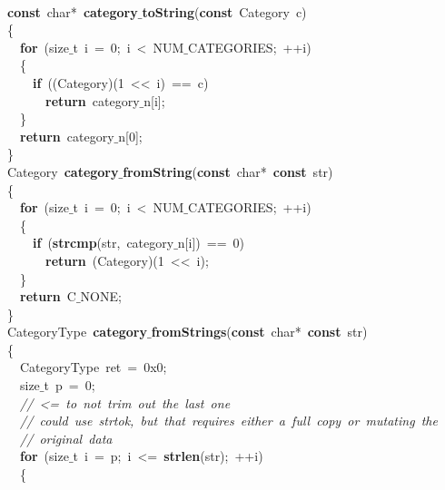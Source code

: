 \documentclass{article}
\begin{document}
\mbox{} \\
\mbox{}\textbf{const}\ char*\ \textbf{category$\_$toString}(\textbf{const}\ Category\ c) \\
\mbox{}\{ \\
\mbox{}\ \ \textbf{for}\ (size$\_$t\ i\ =\ 0;\ i\ \textless{}\ NUM$\_$CATEGORIES;\ ++i) \\
\mbox{}\ \ \{ \\
\mbox{}\ \ \ \ \textbf{if}\ ((Category)(1\ \textless{}\textless{}\ i)\ ==\ c) \\
\mbox{}\ \ \ \ \ \ \textbf{return}\ category$\_$n[i]; \\
\mbox{}\ \ \} \\
\mbox{}\ \ \textbf{return}\ category$\_$n[0]; \\
\mbox{}\} \\
\mbox{}Category\ \textbf{category$\_$fromString}(\textbf{const}\ char*\ \textbf{const}\ str) \\
\mbox{}\{ \\
\mbox{}\ \ \textbf{for}\ (size$\_$t\ i\ =\ 0;\ i\ \textless{}\ NUM$\_$CATEGORIES;\ ++i) \\
\mbox{}\ \ \{ \\
\mbox{}\ \ \ \ \textbf{if}\ (\textbf{strcmp}(str,\ category$\_$n[i])\ ==\ 0) \\
\mbox{}\ \ \ \ \ \ \textbf{return}\ (Category)(1\ \textless{}\textless{}\ i); \\
\mbox{}\ \ \} \\
\mbox{}\ \ \textbf{return}\ C$\_$NONE; \\
\mbox{}\} \\
\mbox{}CategoryType\ \textbf{category$\_$fromStrings}(\textbf{const}\ char*\ \textbf{const}\ str) \\
\mbox{}\{ \\
\mbox{}\ \ CategoryType\ ret\ =\ 0x0; \\
\mbox{}\ \ size$\_$t\ p\ =\ 0; \\
\mbox{}\ \ \textit{//\ \textless{}=\ to\ not\ trim\ out\ the\ last\ one} \\
\mbox{}\ \ \textit{//\ could\ use\ strtok,\ but\ that\ requires\ either\ a\ full\ copy\ or\ mutating\ the} \\
\mbox{}\ \ \textit{//\ original\ data} \\
\mbox{}\ \ \textbf{for}\ (size$\_$t\ i\ =\ p;\ i\ \textless{}=\ \textbf{strlen}(str);\ ++i) \\
\mbox{}\ \ \{ \\
\end{document}
